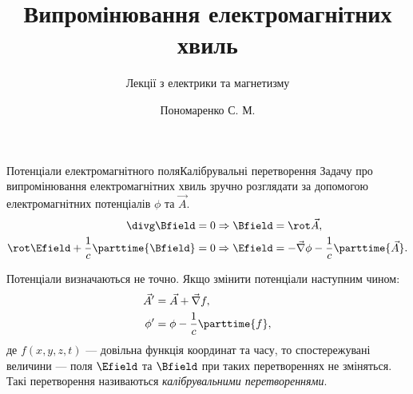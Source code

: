 \documentclass[9pt]{beamer}
\title[Лекції електрики та магнетизму]{\huge\bfseries Випромінювання електромагнітних хвиль}
\subtitle{Лекції з електрики та магнетизму}
\author{Пономаренко С. М.}
\let\vect\vec
\begin{document}
\begin{frame}[plain]
	\maketitle
\end{frame}




\begin{frame}{Потенціали електромагнітного поля}{Калібрувальні перетворення}
	Задачу про випромінювання електромагнітних хвиль зручно розглядати за допомогою електромагнітних потенціалів $ \phi $ та $ \vect{A} $.
	\begin{align*}
		\divg\Bfield = 0                            & \Rightarrow \Bfield = \rot\vect{A},                                     \\
		\rot\Efield + \frac1c\parttime{\Bfield} = 0 & \Rightarrow \Efield = - \vect{\nabla}\phi - \frac1c\parttime{\vect{A}}.
	\end{align*}

	Потенціали визначаються не точно. Якщо змінити потенціали наступним чином:
	\begin{align*}
		\vect{A}' & = \vect{A} + \vect{\nabla} f,  \\
		\phi'     & = \phi - \frac1c \parttime{f},
	\end{align*}
	де $ f (x,y,z,t)$ --- довільна функція координат та часу, то спостережувані величини --- поля $ \Efield $ та $ \Bfield $ при таких перетвореннях не зміняться. Такі перетворення називаються \emph{калібрувальними перетвореннями}.
\end{frame}
\end{document}
